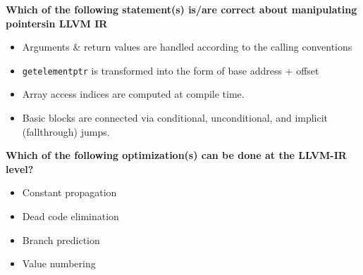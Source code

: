 \textbf{Which of the following statement(s) is/are correct about manipulating pointersin LLVM IR}
\begin{itemize}
\item[\textcolor{green}{C}] Arguments \& return values are handled according to the calling conventions
\item[\textcolor{green}{C}] \texttt{getelementptr} is transformed into the form of base address + offset
\item[\textcolor{red}{W}] Array access indices are computed at compile time.
\item[\textcolor{green}{C}] Basic blocks are connected via conditional, unconditional, and implicit (fallthrough) jumps.
\end{itemize}



\textbf{Which of the following optimization(s) can be done at the LLVM-IR level?}
\begin{itemize}

\item[\textcolor{green}{C}]  Constant propagation
\item[\textcolor{red}{W}]  Dead code elimination
\item[\textcolor{green}{C}] Branch prediction
\item[\textcolor{green}{C}]  Value numbering
\end{itemize}



